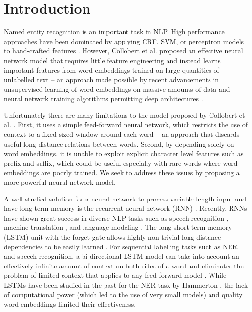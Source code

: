 \documentclass[11pt,letterpaper]{article}
\begin{document}
\section{Introduction}

Named entity recognition is an important task in NLP. High performance approaches have been dominated by applying CRF, SVM, or perceptron models to hand-crafted features \cite{ratinov2009,passos2014,luo2015}. However, Collobert et al.  proposed an effective neural network model that requires little feature engineering and instead learns important features from word embeddings trained on large quantities of unlabelled text -- an approach made possible by recent advancements in unsupervised learning of word embeddings on massive amounts of data \cite{collobert2008,mikolov2013} and neural network training algorithms permitting deep architectures \cite{rumelhart1986}. 

Unfortunately there are many limitations to the model proposed by Collobert et al. . First, it uses a simple feed-forward neural network, which restricts the use of context to a fixed sized window around each word \--- an approach that discards useful long-distance relations between words. Second, by depending solely on word embeddings, it is unable to exploit explicit character level features such as prefix and suffix, which could be useful especially with rare words where word embeddings are poorly trained. We seek to address these issues by proposing a more powerful neural network model.

A well-studied solution for a neural network to process variable length input and have long term memory is the recurrent neural network (RNN) \cite{goller1996}. Recently, RNNs have shown great success in diverse NLP tasks such as speech recognition \cite{graves2013}, machine translation \cite{cho2014}, and language modeling \cite{mikolov2011rnnlm}. The long-short term memory (LSTM) unit with the forget gate allows highly non-trivial long-distance dependencies to be easily learned \cite{gers2000}. For sequential labelling tasks such as NER and speech recognition, a bi-directional LSTM model can take into account an effectively infinite amount of context on both sides of a word and eliminates the problem of limited context that applies to any feed-forward model \cite{graves2013}. While LSTMs have been studied in the past for the NER task by Hammerton , the lack of computational power (which led to the use of very small models) 
and quality word embeddings limited their effectiveness. 
\end{document}
